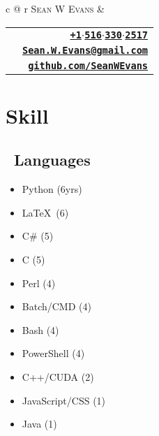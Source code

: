 \documentclass{article}
\begin{document}
\begin{table}[]
	\begin{tabular*}{\textwidth}{c @{\extracolsep{\fill}} r}
		{\Huge \textsc{Sean W Evans}} &
		\begin{tabular}[r]{lr} 
			\href{tel:15163302517}{\faPhone} & 
			\href{tel:15163302517}{\textbf{\texttt{+1$\cdot$516$\cdot$330$\cdot$2517}}} \\ 
			\href{mailto:Sean.W.Evans@gmail.com}{\faEnvelope} & 
			\href{mailto:Sean.W.Evans@gmail.com}{\textbf{\texttt{\color{blue}\underline {Sean.W.Evans@gmail.com}}}} \\ 			
			\href{http://github.com/SeanWEvans}{\faGithub} & \href{http://github.com/SeanWEvans}{\textbf{\texttt{\color{blue}\underline{github.com/SeanWEvans}}}}
		\end{tabular} 
	\end{tabular*}
\end{table}

\vspace*{-5em}
\section{Skill}
\subsection*{\faCodeFork \ Languages} \vspace{-1em}
\begin{multicols}{4}
\small \begin{itemize} 
    \item[\faDiamond] Python (6yrs)
    \item[\faSuperscript] \LaTeX\ (6)    
    \item[\faFighterJet] C\# (5)
    \item[\faCopyright] C (5)
    \item[\faAmbulance] Perl (4)
    \item[\faTerminal] Batch/CMD (4)
    \item[\faTerminal] Bash (4)
    \item[\faTerminal] PowerShell (4)
    \item[\faCreativeCommons] C++/CUDA (2)
    \item[\faJsfiddle] JavaScript/CSS (1)
    \item[\faCoffee ] Java (1)
\end{itemize}
\end{multicols}
\end{document}
